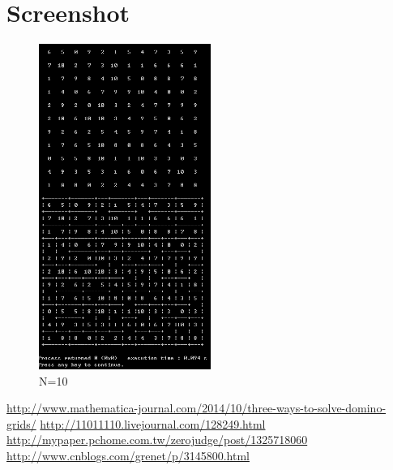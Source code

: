 \documentclass[12pt]{article}
\begin{document}
\section{Screenshot}
	\begin{figure}[H]
	\centering
	\includegraphics[width=0.5\textwidth]{fig_screen_10}
	\caption[Caption for the list of figures]{N=10}
	\label{fig:screen_10}
	\end{figure}


\begin{thebibliography}{9}

\bibitem{}
	\url{http://www.mathematica-journal.com/2014/10/three-ways-to-solve-domino-grids/}
\bibitem{}
	\url{http://11011110.livejournal.com/128249.html}
\bibitem{}
	\url{http://mypaper.pchome.com.tw/zerojudge/post/1325718060}
\bibitem{}
	\url{http://www.cnblogs.com/grenet/p/3145800.html}
  

\end{thebibliography}

 
\end{document}
